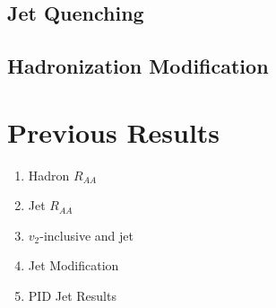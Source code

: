 \subsection*{Jet Quenching}

\subsection*{Hadronization Modification}

\section{Previous Results}

\begin{enumerate}
    \item Hadron $R_{AA}$
    \item Jet $R_{AA}$
    \item $v_2$-inclusive and jet
    \item Jet Modification
    \item PID Jet Results
\end{enumerate}